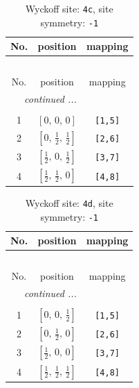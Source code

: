 \documentclass[fleqn,8pt]{jsarticle}
\begin{document}
\renewcommand{\arraystretch}{1.2}
\begin{longtable}{ccc}
\caption{Wyckoff site: {\tt 4c}, site symmetry: {\tt -1}}
 \\
 \hline \hline
No. & position & mapping \\ \hline \endfirsthead

\multicolumn{2}{l}{\tablename\ \thetable{}} \\
 \hline \hline
No. & position & mapping \\ \hline \endhead

 \hline \hline
\multicolumn{2}{r}{\footnotesize\it continued ...} \\ \endfoot

 \hline \hline
\multicolumn{2}{r}{} \\ \endlastfoot

1 & $\left[ 0,\, 0,\, 0 \right]$ & {\tt [1,5]} \\ \hline
2 & $\left[ 0,\, \frac{1}{2},\, \frac{1}{2} \right]$ & {\tt [2,6]} \\ \hline
3 & $\left[ \frac{1}{2},\, 0,\, \frac{1}{2} \right]$ & {\tt [3,7]} \\ \hline
4 & $\left[ \frac{1}{2},\, \frac{1}{2},\, 0 \right]$ & {\tt [4,8]} \\
\end{longtable}
\renewcommand{\arraystretch}{1.2}
\begin{longtable}{ccc}
\caption{Wyckoff site: {\tt 4d}, site symmetry: {\tt -1}}
 \\
 \hline \hline
No. & position & mapping \\ \hline \endfirsthead

\multicolumn{2}{l}{\tablename\ \thetable{}} \\
 \hline \hline
No. & position & mapping \\ \hline \endhead

 \hline \hline
\multicolumn{2}{r}{\footnotesize\it continued ...} \\ \endfoot

 \hline \hline
\multicolumn{2}{r}{} \\ \endlastfoot

1 & $\left[ 0,\, 0,\, \frac{1}{2} \right]$ & {\tt [1,5]} \\ \hline
2 & $\left[ 0,\, \frac{1}{2},\, 0 \right]$ & {\tt [2,6]} \\ \hline
3 & $\left[ \frac{1}{2},\, 0,\, 0 \right]$ & {\tt [3,7]} \\ \hline
4 & $\left[ \frac{1}{2},\, \frac{1}{2},\, \frac{1}{2} \right]$ & {\tt [4,8]} \\
\end{longtable}
\end{document}
